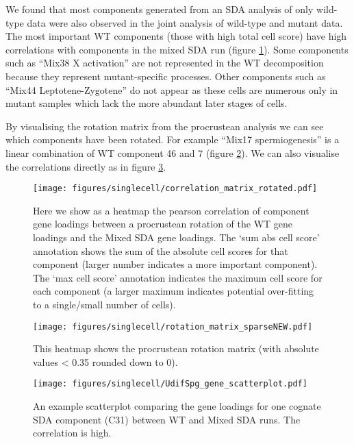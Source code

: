 We found that most components generated from an SDA analysis of only wild-type data were also observed in the joint analysis of wild-type and mutant data. The most important WT components (those with high total cell score) have high correlations with components in the mixed SDA run (figure \ref{fig:WT_vs_Mixed}). Some components such as ``Mix38 X activation'' are not represented in the WT decomposition because they represent mutant-specific processes. Other components such as ``Mix44 Leptotene-Zygotene'' do not appear as these cells are numerous only in mutant samples which lack the more abundant later stages of cells.

By visualising the rotation matrix from the procrustean analysis we can see which components have been rotated. For example ``Mix17 spermiogenesis'' is a linear combination of WT component 46 and 7 (figure \ref{fig:WT_Mix_Rotation}). We can also visualise the correlations directly as in figure \ref{fig:WT_Mix_Correlation}.

\begin{figure}[H]
	\centering
	\texttt{[image: figures/singlecell/correlation\_matrix\_rotated.pdf]}
	\caption[Wild Type vs Mixed SDA]{Here we show as a heatmap the pearson correlation of component gene loadings between a procrustean rotation of the WT gene loadings and the Mixed SDA gene loadings. The ‘sum abs cell score’ annotation shows the sum of the absolute cell scores for that component (larger number indicates a more important component). The ‘max cell score’ annotation indicates the maximum cell score for each component (a larger maximum indicates potential over-fitting to a single/small number of cells).}
	\label{fig:WT_vs_Mixed}
\end{figure}

\begin{figure}[H]
	\centering
	\texttt{[image: figures/singlecell/rotation\_matrix\_sparseNEW.pdf]}
	\caption[Procrustean Rotation Matrix]{This heatmap shows the procrustean rotation matrix (with absolute values < 0.35 rounded down to 0).}
	\label{fig:WT_Mix_Rotation}
\end{figure}

\begin{figure}[H]
	\centering
	\texttt{[image: figures/singlecell/UdifSpg\_gene\_scatterplot.pdf]}
	\caption[Component 31 WT vs Mixed]{An example scatterplot comparing the gene loadings for one cognate SDA component (C31) between WT and Mixed SDA runs. The correlation is high.}
	\label{fig:WT_Mix_Correlation}
\end{figure}

